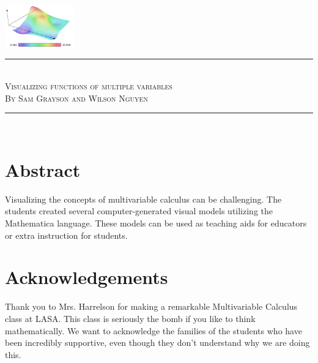 \documentclass[12pt,letterpaper,english]{article}
\begin{document}
\begin{titlepage}
\thispagestyle{plain}
\begin{center}
\vspace*{\fill}

\includegraphics[width=3cm]{logo.png}\\[1cm]

\rule{\linewidth}{0.5mm}\\[0.5cm]

\textsc{\LARGE Visualizing functions of multiple variables}\\[1cm]

\textsc{\large By Sam Grayson and Wilson Nguyen}\\[0.7cm]

{\large \isodate}

\rule{\linewidth}{0.5mm}\\[1cm]

\vspace{0.9cm}

\end{center}

\section*{Abstract}

Visualizing the concepts of multivariable calculus can be challenging. The students created several computer-generated visual models utilizing the Mathematica language. These models can be used as teaching aids for educators or extra instruction for students.

\vspace*{\fill}

\end{titlepage}

\section*{Acknowledgements}

Thank you to Mrs. Harrelson for making a remarkable Multivariable Calculus class at LASA. This class is seriously the bomb if you like to think mathematically. We want to acknowledge the families of the students who have been incredibly supportive, even though they don't understand why we are doing this.
\end{document}
